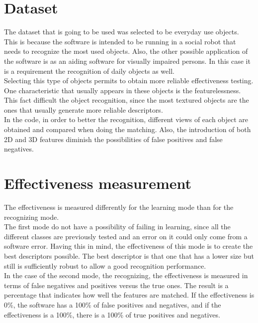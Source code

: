 	\section{Dataset}
		The dataset that is going to be used was selected to be everyday use objects. This is because the software is intended to be running in a social robot that needs to recognize the most used objects. Also, the other possible application of the software is as an aiding software for visually impaired persons. In this case it is a requirement the recognition of daily objects as well.  
		\\

		Selecting this type of objects permits to obtain more reliable effectiveness testing. One characteristic that usually appears in these objects is the featurelessness. This fact difficult the object recognition, since the most textured objects are the ones that usually generate more reliable descriptors. \\

		In the code, in order to better the recognition, different views of each object are obtained and compared when doing the matching. Also, the introduction of both 2D and 3D features diminish the possibilities of false positives and false negatives. 

	\section{Effectiveness measurement}

		The effectiveness is measured differently for the learning mode than for the recognizing mode. 
		\\

		The first mode do not have a possibility of failing in learning, since all the different classes are previously tested and an error on it could only come from a software error. Having this in mind, the effectiveness of this mode is to create the best descriptors possible. 
		The best descriptor is that one that has a lower size but still is sufficiently robust to allow a good recognition performance. 
		\\

		In the case of the second mode, the recognizing, the effectiveness is measured in terms of false negatives and positives versus the true ones. The result is a percentage that indicates how well the features are matched. If the effectiveness is 0\%, the software has a 100\% of false positives and negatives, and if the effectiveness is a 100\%, there is a 100\% of true positives and negatives. \\

		